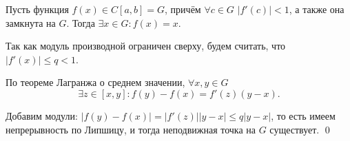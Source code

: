 \documentclass[../main.tex]{subfile}
\begin{document}
\begin{corollary}\label{eq:derivative_condition}
	Пусть функция $f(x)\in C[a,b]=G$, причём $\forall c\in G$ $|f'(c)|<1$,
	а также она замкнута на $G$. Тогда $\exists x\in G: f(x)=x$.
\end{corollary}

\beginproof

	Так как модуль производной ограничен сверху, будем считать, что
	$|f'(x)|\le q<1$.

	По теореме Лагранжа о среднем значении, $\forall x,y\in G$ \\
	\[\exists z\in[x,y]: f(y)-f(x)=f'(z)(y-x).\]

	Добавим модули: $|f(y)-f(x)|=|f'(z)||y-x|\le q|y-x|$, то есть имеем
	непрерывность по Липшицу, и тогда неподвижная точка на $G$ существует.
	\qed
\end{document}
